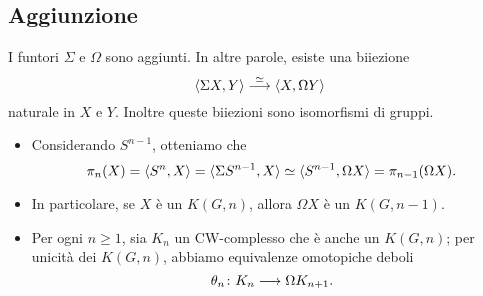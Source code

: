 \subsection*{Aggiunzione}
\begin{frame*}
\begin{proposition}
I funtori $\Sigma$ e $\Omega$ sono aggiunti. In altre parole, esiste una biiezione
\[
\umap[\iso]{\hmaps{\Sigma X,Y}}{\hmaps{X,\Omega Y}}
\]
naturale in $X$ e $Y$. Inoltre queste biiezioni sono isomorfismi di gruppi.
\end{proposition}
\begin{remarks}
\begin{itemize}
\item Considerando $S^{n-1}$, otteniamo che
\[
\pi_n(X)=\langle S^n,X\rangle=\langle \Sigma S^{n-1},X\rangle\simeq\langle S^{n-1},\Omega X\rangle=\pi_{n-1}(\Omega X).
\]
\item In particolare, se $X$ è un $K(G,n)$, allora $\Omega X$ è un $K(G,n-1)$.
\item Per ogni $n\ge 1$, sia $K_n$ un CW-complesso che è anche un $K(G,n)$; per unicità dei $K(G,n)$, abbiamo equivalenze omotopiche deboli
\[
\map{\theta_n}{K_n}{\Omega K_{n+1}}.
\]
\end{itemize}
\end{remarks}
\end{frame*}